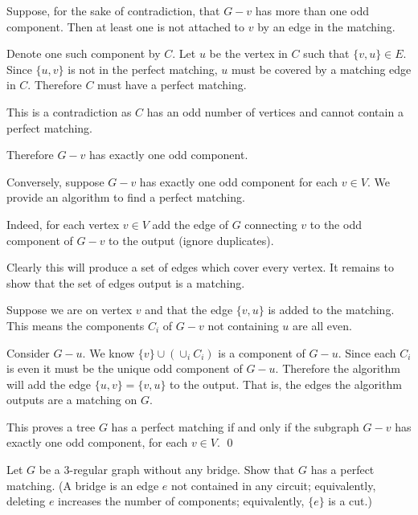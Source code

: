 \documentclass[10pt]{article}
\begin{document}
\begin{solution}
\begin{enumerate}[label=(\roman*)]
        Suppose, for the sake of contradiction, that \( G-v \) has more than one odd component. Then at least one is not attached to \( v \) by an edge in the matching.
        
        Denote one such component by \( C \).
        Let \( u \) be the vertex in \( C \) such that \( \{v,u\} \in E \). Since \( \{u,v\} \) is not in the perfect matching, \( u \) must be covered by a matching edge in \( C \).
        Therefore \( C \) must have a perfect matching.
        
        This is a contradiction as \( C \) has an odd number of vertices and cannot contain a perfect matching. 

        Therefore \( G-v \) has exactly one odd component.
       
        Conversely, suppose \( G-v \) has exactly one odd component for each \( v\in V \). We provide an algorithm to find a perfect matching.

        Indeed, for each vertex \( v\in V \) add the edge of \( G \) connecting \( v \) to the odd component of \( G-v \) to the output (ignore duplicates).

        Clearly this will produce a set of edges which cover every vertex. It remains to show that the set of edges output is a matching.

        Suppose we are on vertex \( v \) and that the edge \( \{v,u\} \) is added to the matching. This means the components \( C_i \) of \( G-v \) not containing \( u \) are all even.

        Consider \( G-u \). We know \( \{ v \}\cup(\cup_i C_i) \) is a component of \( G-u \). Since each \( C_i \) is even it must be the unique odd component of \( G-u \). Therefore the algorithm will add the edge \( \{u,v\} = \{v,u\} \) to the output. That is, the edges the algorithm outputs are a matching on \( G \). 
        
        This proves a tree \( G \) has a perfect matching if and only if the subgraph \( G-v \) has exactly one odd component, for each \( v\in V \). \qed



\end{enumerate}


\end{solution}

\begin{problem}[Problem 5.2]
    Let \( G \) be a 3-regular graph without any bridge. Show that \( G \) has a perfect matching. (A bridge is an edge \( e \) not contained in any circuit; equivalently, deleting \( e \) increases the number of components; equivalently, \( \{ e \} \) is a cut.)
\end{problem}
\end{document}
